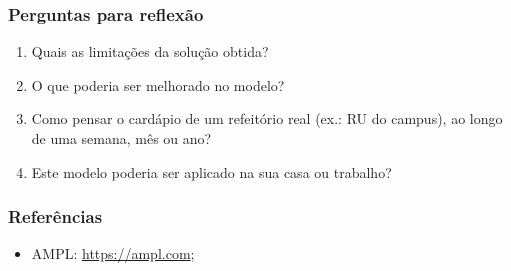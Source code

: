 \documentclass[fleqn]{beamer}
\begin{document}
\begin{frame}
	\frametitle{Perguntas para reflexão}
	\begin{enumerate}
		\item Quais as limitações da solução obtida?
		\item O que poderia ser melhorado no modelo?
		\item Como pensar o cardápio de um refeitório real (ex.: RU do
			campus), ao longo de uma semana, mês ou ano?
		\item Este modelo poderia ser aplicado na sua casa ou trabalho?
	\end{enumerate}
\end{frame}

\begin{frame}
	\frametitle{Referências}
	\begin{itemize}
		\item AMPL: \url{https://ampl.com};
	\end{itemize}
\end{frame}
\end{document}
